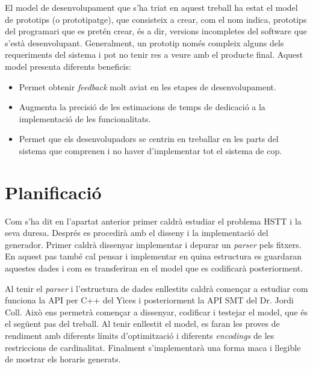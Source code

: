 \documentclass[11pt,a4paper,twoside]{report}
\begin{document}
  El model de desenvolupament que s'ha triat en aquest treball ha estat el model de prototips (o prototipatge), 
  que consisteix a crear, com el nom indica, prototips del programari que es pretén crear, és a dir, versions incompletes del software que s'està desenvolupant.
  Generalment, un prototip només compleix alguns dels requeriments del sistema i pot no tenir res a veure amb el producte final. Aquest model presenta diferents beneficis:
  \begin{itemize}
    \item Permet obtenir \textit{feedback} molt aviat en les etapes de desenvolupament.
    \item Augmenta la precisió de les estimacions de temps de dedicació a la implementació de les funcionalitats. 
    \item Permet que els desenvolupadors se centrin en treballar en les parts del sistema que comprenen i no haver d'implementar tot el sistema de cop.
  \end{itemize}



  \section{Planificació}

  Com s'ha dit en l'apartat anterior primer caldrà estudiar el problema HSTT i la seva duresa. 
  Després es procedirà amb el disseny i la implementació del generador. Primer caldrà dissenyar implementar i depurar un \textit{parser} pels fitxers. En aquest pas també cal pensar i implementar en quina estructura es guardaran aquestes dades i com es transferiran en el model que es codificarà posteriorment. 

  Al tenir el \textit{parser} i l'estructura de dades enllestits caldrà començar a estudiar com funciona la API per C++ del Yices i 
  posteriorment la API SMT del Dr. Jordi Coll. Això ens permetrà començar a dissenyar, codificar i testejar el model, que és el següent pas del treball. 
  Al tenir enllestit el model, es faran les proves de rendiment amb diferents límits d'optimització i diferents \textit{encodings} de les restriccions de cardinalitat.
  Finalment s'implementarà una forma maca i llegible de mostrar els horaris generats.
  
\end{document}
